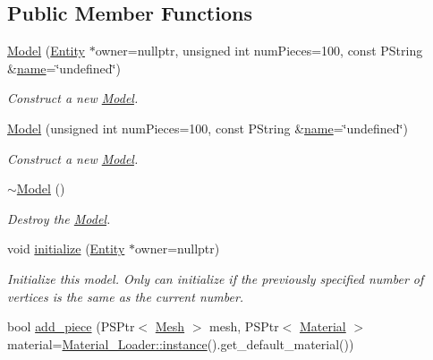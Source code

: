 \subsection*{Public Member Functions}
\begin{DoxyCompactItemize}
\item 
\mbox{\hyperlink{classprz_1_1_model_af337bec498ad5894e6636689254ae9f7}{Model}} (\mbox{\hyperlink{classprz_1_1_entity}{Entity}} $\ast$owner=nullptr, unsigned int num\+Pieces=100, const P\+String \&\mbox{\hyperlink{classprz_1_1_model_aa9a4c5370ebe94b8d34c83e7b6317239}{name}}=\char`\"{}undefined\char`\"{})
\begin{DoxyCompactList}\small\item\em Construct a new \mbox{\hyperlink{classprz_1_1_model}{Model}}. \end{DoxyCompactList}\item 
\mbox{\hyperlink{classprz_1_1_model_a4ea2432067b96e8ce943f5588f41c43f}{Model}} (unsigned int num\+Pieces=100, const P\+String \&\mbox{\hyperlink{classprz_1_1_model_aa9a4c5370ebe94b8d34c83e7b6317239}{name}}=\char`\"{}undefined\char`\"{})
\begin{DoxyCompactList}\small\item\em Construct a new \mbox{\hyperlink{classprz_1_1_model}{Model}}. \end{DoxyCompactList}\item 
\mbox{\hyperlink{classprz_1_1_model_a80543f3a7b7034799221143c28fc8dab}{$\sim$\+Model}} ()
\begin{DoxyCompactList}\small\item\em Destroy the \mbox{\hyperlink{classprz_1_1_model}{Model}}. \end{DoxyCompactList}\item 
void \mbox{\hyperlink{classprz_1_1_model_a88179eb2baaa2186479234d252612ea3}{initialize}} (\mbox{\hyperlink{classprz_1_1_entity}{Entity}} $\ast$owner=nullptr)
\begin{DoxyCompactList}\small\item\em Initialize this model. Only can initialize if the previously specified number of vertices is the same as the current number. \end{DoxyCompactList}\item 
bool \mbox{\hyperlink{classprz_1_1_model_a462a854cd7ca40a0484e23d92c64deb9}{add\+\_\+piece}} (P\+S\+Ptr$<$ \mbox{\hyperlink{classprz_1_1_mesh}{Mesh}} $>$ mesh, P\+S\+Ptr$<$ \mbox{\hyperlink{classprz_1_1_material}{Material}} $>$ material=\mbox{\hyperlink{classprz_1_1_material___loader_a5fa3903db95525602037c029debb6532}{Material\+\_\+\+Loader\+::instance}}().get\+\_\+default\+\_\+material())

\end{DoxyCompactItemize}

